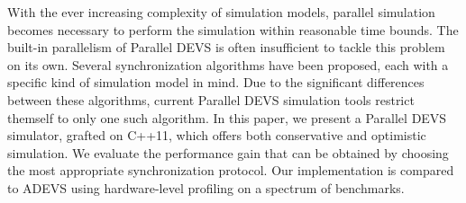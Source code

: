 With the ever increasing complexity of simulation models, parallel simulation
becomes necessary to perform the simulation within reasonable time bounds.
The built-in parallelism of Parallel DEVS is often insufficient to tackle this
problem on its own. Several synchronization algorithms have been proposed,
each with a specific kind of simulation model in mind. Due to the significant
differences between these algorithms, current Parallel DEVS simulation tools
restrict themself to only one such algorithm. In this paper, we present a
Parallel DEVS simulator, grafted on C++11, which offers both conservative and
optimistic simulation. We evaluate the performance gain that can be obtained
by choosing the most appropriate synchronization protocol. Our implementation
is compared to ADEVS using hardware-level profiling on a spectrum of benchmarks.
